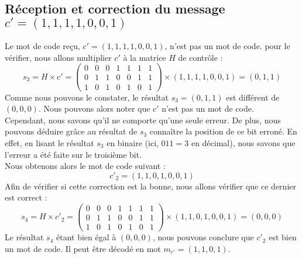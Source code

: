 \subsection{Réception et correction du message $c'=(1,1,1,1,0,0,1)$}
Le mot de code reçu, $c'=(1,1,1,1,0,0,1)$, n'est pas un mot de code. pour le vérifier, nous allons multiplier $c'$ à la matrice $H$ de contrôle :
\begin{equation}
 s_3=H\times c'=
  \begin{pmatrix}
  0 & 0 & 0 & 1 & 1 & 1 & 1 \\
  0 & 1 & 1 & 0 & 0 & 1 & 1 \\
  1 & 0 & 1 & 0 & 1 & 0 & 1
 \end{pmatrix}
 \times(1,1,1,1,0,0,1)=(0,1,1)
\end{equation}
Comme nous pouvons le constater, le résultat $s_3=(0,1,1)$ est différent de $(0,0,0)$. Nous pouvons alors noter que $c'$ n'est pas un mot de code. \\
Cependant, nous savons qu'il ne comporte qu'une seule erreur. De plus, nous pouvons déduire grâce au résultat de $s_3$ connaître la position de ce bit erroné. En effet, en lisant le résultat $s_3$ en binaire (ici, $011=3$ en décimal), nous savons que l'erreur a été faite sur le troisième bit.\\
Nous obtenons alors le mot de code suivant :
\begin{equation}
 c'_2=(1,1,0,1,0,0,1)
\end{equation}
Afin de vérifier si cette correction est la bonne, nous allons vérifier que ce dernier est correct : 
\begin{equation}
 s_4=H\times c'_2=
  \begin{pmatrix}
  0 & 0 & 0 & 1 & 1 & 1 & 1 \\
  0 & 1 & 1 & 0 & 0 & 1 & 1 \\
  1 & 0 & 1 & 0 & 1 & 0 & 1
 \end{pmatrix}
 \times(1,1,0,1,0,0,1)=(0,0,0)
\end{equation}
Le résultat $s_4$ étant bien égal à $(0,0,0)$, nous pouvons conclure que $c'_2$ est bien un mot de code. Il peut être décodé en mot $m_{c'}=(1,1,0,1)$.
